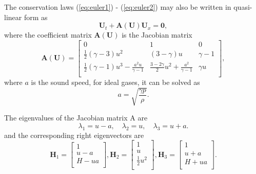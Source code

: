 \documentclass[review]{elsarticle}
\begin{document}
The conservation laws (\ref{eq:euler1}) - (\ref{eq:euler2}) may also be written in quasi-linear form as
\begin{equation}
  \mathbf{U}_t + \mathbf{A}(\mathbf{U})\mathbf{U}_x = \mathbf{0},
\end{equation}
where the coefficient matrix $\mathbf{A}(\mathbf{U})$ is the Jacobian matrix 
\begin{equation}
  \mathbf{A}(\mathbf{U}) = %
  \left[\begin{array}{lll}
	  0 & 1 & 0 \\
	  \frac{1}{2}(\gamma -3)u^2 & (3-\gamma)u & \gamma -1 \\
	  \frac{1}{2}(\gamma -1)u^3 -\frac{a^2u}{\gamma -1} & \frac{3-2\gamma}{2}u^2+\frac{a^2}{\gamma -1} & \gamma u \\
  \end{array} \right],
\end{equation}
where $a$ is the  sound speed, for ideal gases, it can be solved as
\begin{equation}
  a = \sqrt{\frac{\gamma p}{\rho}}.
\end{equation}

The eigenvalues of the Jacobian matrix A are
\begin{equation}
  \lambda_1 = u-a, \quad \lambda_2 = u, \quad \lambda_3 = u+a.
\end{equation}
and  the corresponding right eigenvectors are
\begin{equation}
  \mathbf{H}_1 = \left[\begin{array}{c}
	  1\\ u -a \\ H - ua \\
  \end{array}\right],
  \mathbf{H}_2 = \left[\begin{array}{c}
	  1\\ u  \\ \frac{1}{2}u^2 \\
  \end{array}\right],
  \mathbf{H}_3 = \left[\begin{array}{c}
	  1\\ u+a  \\H +u a \\
  \end{array}\right].
\end{equation}
\end{document}
